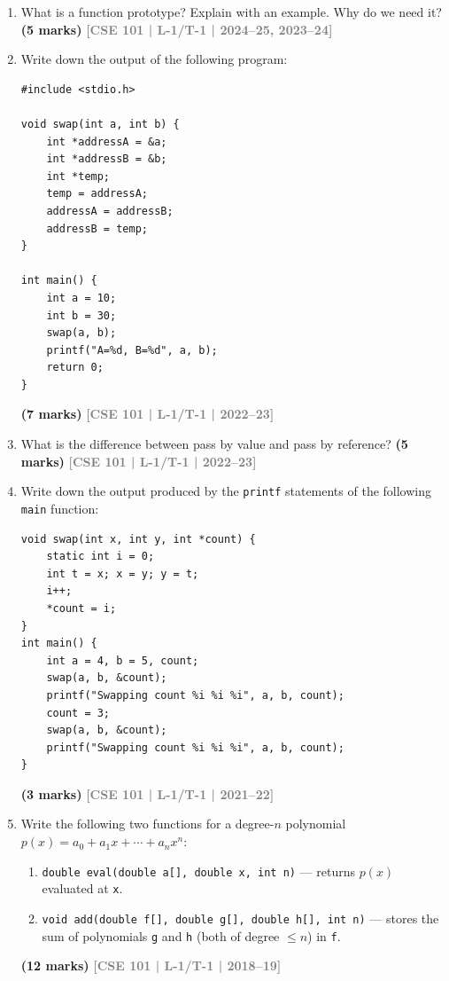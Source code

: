 \documentclass[12pt,a3paper]{article}
\newcommand{\yr}[1]{\hfill\textcolor{gray}{\small\textbf{[#1]}}}
\newcommand{\mk}[1]{\textcolor{orange!70!black}{\small\textbf{(#1 marks)}}}
\begin{document}
\begin{enumerate}

\item What is a function prototype? Explain with an example. Why do we need it?
\mk{5} \yr{CSE 101 | L-1/T-1 | 2024--25, 2023--24}

\item Write down the output of the following program:
 
\begin{lstlisting}
#include <stdio.h>

void swap(int a, int b) {
    int *addressA = &a;
    int *addressB = &b;
    int *temp;
    temp = addressA;
    addressA = addressB;
    addressB = temp;
}

int main() {
    int a = 10;
    int b = 30;
    swap(a, b);
    printf("A=%d, B=%d", a, b);
    return 0;
}
\end{lstlisting}
\mk{7} \yr{CSE 101 | L-1/T-1 | 2022--23}

\item What is the difference between pass by value and pass by reference?
\mk{5} \yr{CSE 101 | L-1/T-1 | 2022--23}

\item Write down the output produced by the \texttt{printf} statements of the following \texttt{main} function:
 
\begin{lstlisting}
void swap(int x, int y, int *count) {
    static int i = 0;
    int t = x; x = y; y = t;
    i++;
    *count = i;
}
int main() {
    int a = 4, b = 5, count;
    swap(a, b, &count);
    printf("Swapping count %i %i %i", a, b, count);
    count = 3;
    swap(a, b, &count);
    printf("Swapping count %i %i %i", a, b, count);
}
\end{lstlisting}
\mk{3} \yr{CSE 101 | L-1/T-1 | 2021--22}

\item Write the following two functions for a degree-$n$ polynomial $p(x) = a_0 + a_1 x + \cdots + a_n x^n$:
\begin{enumerate}
  \item \texttt{double eval(double a[], double x, int n)} --- returns $p(x)$ evaluated at \texttt{x}.
  \item \texttt{void add(double f[], double g[], double h[], int n)} --- stores the sum of polynomials \texttt{g} and \texttt{h} (both of degree $\le n$) in \texttt{f}.
\end{enumerate}
\mk{12} \yr{CSE 101 | L-1/T-1 | 2018--19}


\end{enumerate}
\end{document}
